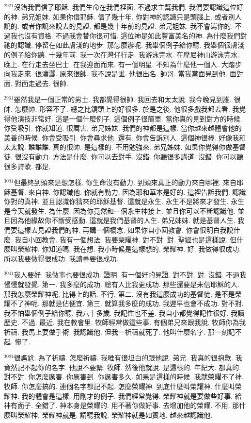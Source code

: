 \documentclass{book}
\begin{document}
$^{2921}$沒錯我們信了耶穌.
我們生命在我們裡面.
不過求主幫我們.
我們要認識這位好的神.
弟兄姐妹.
如果你信耶穌.
信了幾十年.
你對神的認識只是頭腦上.
或者別人說的.
或者你說來說去的見證.
都是幾十年前的見證.
弟兄姐妹.
我不會罵你的.
不過我也沒有資格.
不過我會替你很可惜.
這位神是如此豐富美名的神.
為什麼我們對祂的認識.
停留在如此膚淺的地步.
那怎麼辦呢.
我舉個例子給你聽.
我舉個很膚淺的例子給你聽.
十幾年前.
我一次在灣仔行走.
我游泳完水.
在摩尼神山游泳完水.
晚上.
在行走去坐巴士.
在我迎面而來.
有一個明星.
不知為什麼他一個人.
大踏步向我走來.
很瀟灑.
原來很帥.
我不說是誰.
他很出名.
帥哥.
當我當面見到他.
面對面.
對面走過去.
很帥.

$^{2961}$雖然我是一個正常的男士.
我都覺得很帥.
我回去和太太說.
我今晚見到誰.
很帥.
怎麼帥.
形容不了.
總之比鏡頭上的好很多.
於是之後.
他很多戲我都去看.
我覺得他演技非常好.
這是一個什麼例子.
這個例子很簡單.
當你真的見到對方的時候.
你受吸引.
你就知道.
很厲害.
弟兄姊妹.
我們的神都是這樣.
當你越來越體會他的美善的時候.
你會受吸引.
你會尋求他.
還有.
你會告訴別人.
這個神很棒.
好像我和太太說.
誰誰誰.
真的很帥.
是這樣的.
不用勉強來.
弟兄姊妹.
如果你覺得你做基督徒.
很沒有動力.
方法是什麼.
你可以去對手.
沒錯.
你聽很多講道.
沒錯.
你可以聽很多詩歌.
都是.

$^{3001}$但最終到頭來是想怎樣.
你生命沒有動力.
到頭來真正的動力來自哪裡.
來自耶穌基督.
來自神.
你認識他.
你就有動力.
因為耶和華本是好的.
這裡告訴我們.
認識你對的真神.
並且認識你猜來的耶穌基督.
這就是永生.
永生不是將來才發生.
永生是今天就發生.
為什麼.
因為你竟然和一個永生神接上.
並且你可以不斷認識他.
並且因為他緣故你不斷受感動.
這就是我們基督的人生.
弟兄姊妹.
就是基督人生.
我們要這樣去見證我們的神.
再講一個概念.
如果你自小回教會.
你會很明白我說什麼.
我自小回教會.
我有一個想法.
我要榮耀神.
對不對.
對.
聖經也是這樣說.
但什麼叫榮耀神.
你知道嗎.
我在想.
我小時候是這樣想的.
榮耀神.
好.
我做得很成功.
所以我要做得很成功.
我讀書要很成功.

$^{3041}$我人要好.
我做事也要很成功.
證明.
有一個好的見證.
對不對.
對.
沒錯.
不過我慢慢就發覺.
第一.
我多麼的成功.
總有人比我更成功.
那些還要是未信耶穌的人.
那我怎麼榮耀神呢.
比得上的話.
不行.
第二.
沒有我這麼成功的基督徒.
是不是榮耀不了神呢.
那就是佔便宜.
第三.
就算我多麼的成功.
我遲早也會不成功.
對不對.
我不怕舉個例子給你聽.
我六十多歲.
我記性也不差.
我自小都覺得記性很好.
我讀歷史.
不過.
最近.
我在教會里.
牧師經常做這些事.
有個弟兄來跟我說.
牧師你為我祈禱.
我馬上要做手術.
我認識他.
但我一祈禱就死了.
他叫什麼名字.
那一刻記不起.
慘了.

$^{3081}$很尷尬.
為了祈禱.
怎麼祈禱.
我唯有很坦白的跟他說.
弟兄.
我真的很抱歉.
我竟然記不起你的名字.
他說不要緊.
牧師.
然後他就說.
是這樣的.
年紀大.
都真的.
對不對.
你怎麼厲害.
你厲害到.
你厲害多久.
如果是這樣的時候.
我就榮耀不了神.
牧師.
你怎麼搞的.
連個名字都記不起.
怎麼榮耀神.
到底什麼叫榮耀神.
什麼叫榮耀神.
我的體會是這樣.
用剛才的例子.
我們經常覺得.
榮耀神就是要做些好事.
給神有面子.
全錯了.
神本身是榮耀的.
用不著你做好事.
去增加他的榮耀.
不用.
那什麼叫榮耀神.
榮耀神就是.
請聽我說.
榮耀神就是如實地.
越來越認識他.
\end{document}
